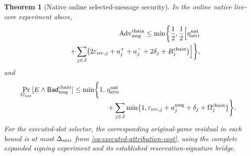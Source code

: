 \documentclass[pdflatex]{sn-jnl}
\theoremstyle{thmstyleone}
\newtheorem{theorem}{Theorem}[section]
\theoremstyle{thmstylethree}
\theoremstyle{thmstyletwo}
\begin{document}
\begin{theorem}[Native online selected-message security]
\label{thm:native-online-message}
In the online native live-core experiment above,
\begin{equation}
\begin{split}
 \operatorname{Adv}_{\rm msg}^{\rm chain}
 \le\min\biggl\{\frac12,\frac12\Bigl[
    \eta_{\rm attr}^{\rm nat}\\[-2pt]
 \qquad+
 \sum_{j\in J}\bigl(2\varepsilon_{{\rm rec},j}
       +a_j^++a_j^-+2\delta_j+B_j^{\rm chain}\bigr)
                       \Bigr]\biggr\},
\end{split}
\label{eq:native-online-confidentiality}
\end{equation}
and
\begin{equation}
\begin{split}
 \Pr_{G_{\rm nat}}[E\wedge\mathsf{Bad}_{\rm msg}^{\rm chain}]
 \le\min\biggl\{1,\;&\eta_{\rm attr}^{\rm nat}\\[-2pt]
 &+\sum_{j\in J}\min\{1,\varepsilon_{{\rm rec},j}
       +a_j^{\rm msg}+\delta_j+\Omega_j^{\rm chain}\}\biggr\}.
\end{split}
\label{eq:native-online-integrity}
\end{equation}
For the executed-slot selector, the corresponding original-game
residual in each bound is at most $\Delta_{\rm attr}$ from
\eqref{eq:executed-attribution-cost}, using the complete expanded
signing experiment and its established reservation-signature bridge.
\end{theorem}
\end{document}
